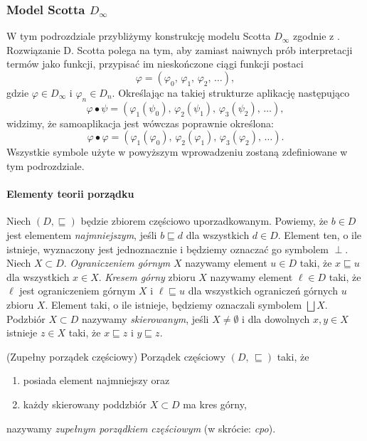 \subsubsection{Model Scotta \(D_\infty\)}
W tym podrozdziale przybliżymy konstrukcję modelu Scotta \(D_\infty\) zgodnie z \cite[Rozdział 16]{Hindley:2008:LCI:1388400}. Rozwiązanie D. Scotta polega na tym, aby zamiast naiwnych prób interpretacji termów jako funkcji, przypisać im nieskończone ciągi funkcji postaci 
\[
  \varphi = (\varphi_0,\,\varphi_1,\,\varphi_2,\,\dots),
\]
gdzie \(\varphi \in D_\infty\) i \(\varphi_n\in D_n\). Określając na takiej strukturze aplikację następująco
\[
  \varphi\bullet\psi = (\varphi_1(\psi_0),\,\varphi_2(\psi_1),\,\varphi_3(\psi_2),\,\dots),
\]
widzimy, że samoaplikacja jest wówczas poprawnie określona: 
\[
  \varphi\bullet\varphi = (\varphi_1(\varphi_0),\,\varphi_2(\varphi_1),\,\varphi_3(\varphi_2),\,\dots).
\]
Wszystkie symbole użyte w powyższym wprowadzeniu zostaną zdefiniowane w tym podrozdziale.

\paragraph{Elementy teorii porządku} 
Niech \((D,\sqsubseteq)\) będzie zbiorem częściowo uporzadkowanym. Powiemy, że \(b\in D\) jest elementem \emph{najmniejszym}, jeśli \(b\sqsubseteq d\) dla wszystkich \(d\in D\). Element ten, o ile istnieje, wyznaczony jest jednoznacznie i będziemy oznaczać go symbolem \(\perp\). Niech \(X\subset D\). \emph{Ograniczeniem górnym} \(X\) nazywamy element \(u\in D\) taki, że \(x\sqsubseteq u\) dla wszystkich \(x\in X\). \emph{Kresem górny} zbioru \(X\) nazywamy element \(\ell\in D\) taki, że \(\ell\) jest ograniczeniem górnym \(X\) i \(\ell\sqsubseteq u\) dla wszystkich ograniczeń górnych \(u\) zbioru \(X\). Element taki, o ile istnieje, będziemy oznaczali symbolem \(\bigsqcup X\). Podzbiór \(X\subset D\) nazywamy \emph{skierowanym}, jeśli \(X\neq\emptyset\) i dla dowolnych \(x, y\in X\) istnieje \(z\in X\) taki, że \(x\sqsubseteq z\) i \(y\sqsubseteq z\). 

\begin{definicja}(Zupełny porządek częściowy) %
Porządek częściowy \((D,\,\sqsubseteq)\) taki, że
\begin{enumerate}[label={(\alph*)}, ref={(\alph*)}]
  \setlength\itemsep{0em}
  \item posiada element najmniejszy oraz
  \item każdy skierowany poddzbiór \(X\subset D\) ma kres górny,
\end{enumerate}
  nazywamy \emph{zupełnym porządkiem częściowym} (w skrócie: \emph{cpo}).
\end{definicja}

